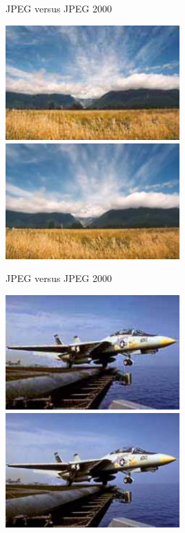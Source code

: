 \documentclass{beamer}
\begin{document}
  \begin{frame}{JPEG versus JPEG 2000}
    \begin{multicols}{2}
      \includegraphics[width=0.5\textwidth]{figure/ex_jpeg_01.jpg}
      \includegraphics[width=0.5\textwidth]{figure/ex_jpeg2k_01_2.jpg}
    \end{multicols}
  \end{frame}

  \begin{frame}{JPEG versus JPEG 2000}
    \begin{multicols}{2}
      \includegraphics[width=0.5\textwidth]{figure/ex_jpeg_02_1.jpg}
      \includegraphics[width=0.5\textwidth]{figure/ex_jpeg2k_02_2.jpg}
    \end{multicols}
  \end{frame}
\end{document}
